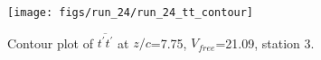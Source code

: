 \begin{figure}[H]
\centering
\texttt{[image: figs/run\_24/run\_24\_tt\_contour]}
\caption{Contour plot of $\overline{t^\prime t^\prime}$ at $z/c$=7.75, $V_{free}$=21.09, station 3.}
\label{fig:run_24_tt_contour}
\end{figure}


